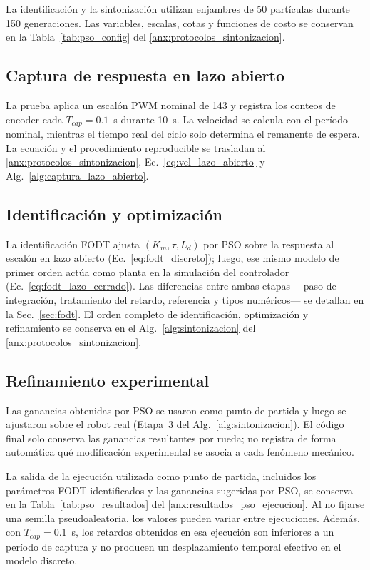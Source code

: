 La identificación y la sintonización utilizan enjambres de 50 partículas
durante 150 generaciones. Las variables, escalas, cotas y funciones de costo se
conservan en la Tabla~\ref{tab:pso_config} del
\ref{anx:protocolos_sintonizacion}.

\subsection{Captura de respuesta en lazo abierto}
\label{sec:captura_lazo_abierto}

La prueba aplica un escalón PWM nominal de 143 y registra los
conteos de encoder cada $T_{cap}=0.1$~s durante 10~s. La velocidad se calcula
con el período nominal, mientras el tiempo real del ciclo solo determina el
remanente de espera. La ecuación y el procedimiento reproducible se trasladan
al \ref{anx:protocolos_sintonizacion}, Ec.~\eqref{eq:vel_lazo_abierto} y
Alg.~\ref{alg:captura_lazo_abierto}.

\subsection{Identificación y optimización}

La identificación FODT ajusta $(K_m,\tau,L_d)$ por PSO sobre la respuesta al escalón en lazo abierto (Ec.~\ref{eq:fodt_discreto}); luego, ese mismo modelo de primer orden actúa como planta en la simulación del controlador (Ec.~\ref{eq:fodt_lazo_cerrado}). Las diferencias entre ambas etapas —paso de integración, tratamiento del retardo, referencia y tipos numéricos— se detallan en la Sec.~\ref{sec:fodt}. El orden completo de identificación, optimización y refinamiento se conserva en el Alg.~\ref{alg:sintonizacion} del \ref{anx:protocolos_sintonizacion}.

\subsection{Refinamiento experimental}
\label{subsec:refinamiento_iterativo}

Las ganancias obtenidas por PSO se usaron como punto de partida y luego se ajustaron sobre el robot real (Etapa~3 del Alg.~\ref{alg:sintonizacion}). El código final solo conserva las ganancias resultantes por rueda; no registra de forma automática qué modificación experimental se asocia a cada fenómeno mecánico.

La salida de la ejecución utilizada como punto de partida, incluidos los
parámetros FODT identificados y las ganancias sugeridas por PSO, se conserva en
la Tabla~\ref{tab:pso_resultados} del
\ref{anx:resultados_pso_ejecucion}. Al no fijarse una semilla pseudoaleatoria,
los valores pueden variar entre ejecuciones. Además, con
$T_{cap}=0.1$~s, los retardos obtenidos en esa ejecución son inferiores a un
período de captura y no producen un desplazamiento temporal efectivo en el
modelo discreto.

